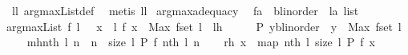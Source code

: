 \begin{isabellebody}
%
\isadelimproof
%
\endisadelimproof
%
\isatagproof
{}\isamarkupfalse%
\ ll{}\ argmaxList{\isacharunderscore}def\ \isamarkupfalse%
\ {\isacharparenleft}metis\ ll{}{}{\isacharparenright}%
\endisatagproof
{\isafoldproof}%
%
\isadelimproof
\isanewline
%
\endisadelimproof
\isanewline
{}\isamarkupfalse%
\ argmaxadequacy{\isacharcolon}\ \isanewline
\isanewline
{}\ f{\isacharcolon}{\isacharcolon}{\isachardoublequoteopen}{\isacharprime}a\ {\isacharequal}{\isachargreater}\ {\isacharparenleft}{\isacharprime}b{\isacharcolon}{\isacharcolon}linorder{\isacharparenright}{\isachardoublequoteclose}\ \ l{\isacharcolon}{\isacharcolon}{\isachardoublequoteopen}{\isacharprime}a\ list{\isachardoublequoteclose}\ \ \isanewline
{\isachardoublequoteopen}argmaxList\ f\ l\ {\isacharequal}\ {\isacharbrackleft}\ x\ {\isacharless}{\isacharminus}\ l{\isachardot}\ f\ x\ {\isasymge}\ Max\ {\isacharparenleft}f{\isacharbackquote}{\isacharparenleft}set\ l{\isacharparenright}{\isacharparenright}{\isacharbrackright}{\isachardoublequoteclose}\ {\isacharparenleft}\ {\isachardoublequoteopen}{\isacharquery}lh{\isacharequal}{\isacharunderscore}{\isachardoublequoteclose}{\isacharparenright}\isanewline
%
\isadelimproof
%
\endisadelimproof
%
\isatagproof
{}\isamarkupfalse%
\ {\isacharminus}\isanewline
\ \ \isamarkupfalse%
\ {\isacharquery}P{\isacharequal}{\isachardoublequoteopen}{\isacharpercent}\ y{\isacharcolon}{\isacharcolon}{\isacharparenleft}{\isacharprime}b{\isacharcolon}{\isacharcolon}linorder{\isacharparenright}\ {\isachardot}\ y\ {\isasymge}\ Max\ {\isacharparenleft}f{\isacharbackquote}{\isacharparenleft}set\ l{\isacharparenright}{\isacharparenright}{\isachardoublequoteclose}\isanewline
\ \ \isamarkupfalse%
\ {\isacharquery}mh{\isacharequal}{\isachardoublequoteopen}{\isacharbrackleft}nth\ l\ n\ {\isachardot}\ n\ {\isacharless}{\isacharminus}\ {\isacharbrackleft}{}{\isachardot}{\isachardot}{\isacharless}size\ l{\isacharbrackright}{\isacharcomma}\ {\isacharquery}P\ {\isacharparenleft}f\ {\isacharparenleft}nth\ l\ n{\isacharparenright}{\isacharparenright}{\isacharbrackright}{\isachardoublequoteclose}\isanewline
\ \ \isamarkupfalse%
\ {\isacharquery}rh{\isacharequal}{\isachardoublequoteopen}{\isacharbrackleft}\ x\ {\isacharless}{\isacharminus}\ {\isacharparenleft}map\ {\isacharparenleft}nth\ l{\isacharparenright}\ {\isacharbrackleft}{}{\isachardot}{\isachardot}{\isacharless}size\ l{\isacharbrackright}{\isacharparenright}{\isachardot}\ {\isacharquery}P\ {\isacharparenleft}f\ x{\isacharparenright}{\isacharbrackright}{\isachardoublequoteclose}\isanewline

\end{isabellebody}
